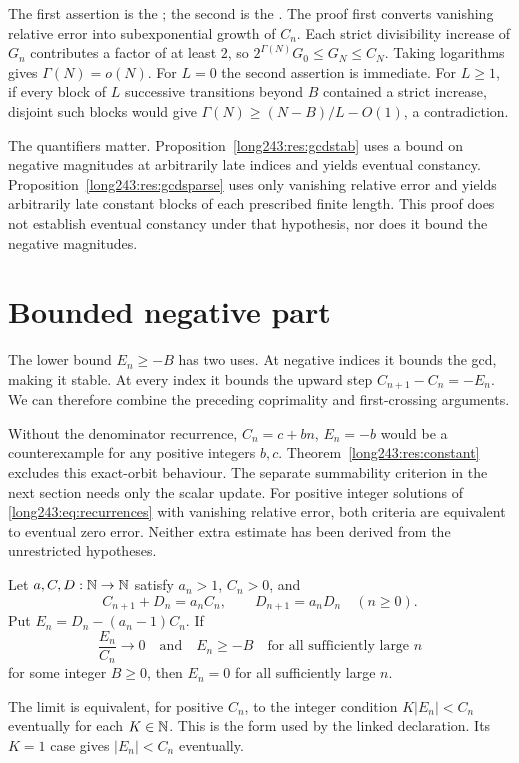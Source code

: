 \documentclass[11pt]{article}
\begin{document}
\noindent The first assertion is the
; the second is the
. The proof first converts vanishing relative
error into subexponential growth of $C_n$. Each strict divisibility increase
of $G_n$ contributes a factor of at least $2$, so
$2^{\Gamma(N)}G_0\le G_N\le C_N$. Taking logarithms gives
$\Gamma(N)=o(N)$. For $L=0$ the second assertion is immediate.
For $L\ge1$, if every block of $L$ successive transitions beyond $B$
contained a strict increase, disjoint such blocks would give
$\Gamma(N)\ge(N-B)/L-O(1)$, a contradiction.

The quantifiers matter.  Proposition~\ref{long243:res:gcdstab} uses a bound on negative
magnitudes at arbitrarily late indices and yields eventual constancy.  Proposition~\ref{long243:res:gcdsparse}
uses only vanishing relative error and yields arbitrarily late constant blocks of
each prescribed finite length. This proof does not establish eventual
constancy under that hypothesis, nor does it bound the negative magnitudes.

\section{Bounded negative part}\label{long243:sec:bounded}


The lower bound $E_n\ge-B$ has two uses. At negative indices it
bounds the gcd, making it stable. At every index it bounds the upward
step $C_{n+1}-C_n=-E_n$. We can therefore combine the preceding
coprimality and first-crossing arguments.

Without the denominator recurrence, $C_n=c+bn$, $E_n=-b$ would be
a counterexample for any positive integers $b,c$.
Theorem~\ref{long243:res:constant} excludes this exact-orbit behaviour.
The separate summability criterion in the next section needs only the
scalar update. For positive integer solutions of \eqref{long243:eq:recurrences} with vanishing relative error,
both criteria are equivalent to eventual zero error. Neither extra
estimate has been derived from the unrestricted hypotheses.

\begin{theorem}\label{long243:res:bounded}
Let $a,C,D:\mathbb{N}\to\mathbb{N}$ satisfy $a_n>1$, $C_n>0$, and
\[
 C_{n+1}+D_n=a_nC_n,\qquad D_{n+1}=a_nD_n
 \quad(n\ge0).
\]
Put $E_n=D_n-(a_n-1)C_n$. If
\[
 \frac{E_n}{C_n}\longrightarrow0
 \quad\text{and}\quad E_n\ge-B\quad\text{for all sufficiently large }n
\]
for some integer $B\ge0$, then $E_n=0$ for all sufficiently large $n$.
\end{theorem}
The limit is equivalent, for positive $C_n$, to the integer condition
$K|E_n|<C_n$ eventually for each $K\in\mathbb{N}$. This is the form used
by the linked declaration. Its $K=1$ case gives $|E_n|<C_n$ eventually.
\end{document}
